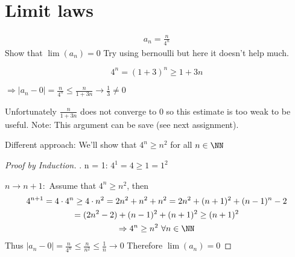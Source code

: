 \documentclass[class=scrartcl, crop=false]{standalone}
\begin{document}
\section{Limit laws}

\begin{example}
  \begin{gather*}
    a_n = \frac{n}{4^n}
  \end{gather*}
  Show that $\lim(a_n) = 0$ Try using bernoulli but here it doesn't help much.

  \[4^n = (1 + 3)^n \geq 1 + 3n\]

  $\Rightarrow |a_n - 0| = \frac{n}{4^n} \leq \frac{n}{1 + 3n} \to \frac{1}{3} \neq 0$
  \newline

  Unfortunately $\frac{n}{1 + 3n}$ does not converge to $0$ so this estimate is too weak to be useful. Note: This argument can be save (see next assignment).
  \newline

  Different approach: We'll show that $4^n \geq n^2$ for all $n \in \NN$ 

  \begin{proof}[Proof by Induction].\newline
    n = 1: $4^1 = 4 \geq 1 = 1^2$ 

    $n \to n + 1:$ Assume that $4^n \geq n^2$, then 
    \begin{gather*}
      4^{n  + 1} = 4 \cdot 4^n \geq 4 \cdot n^2 = 2n^2 + n^2 + n^2 = 2n^2 + (n + 1)^2 + (n - 1)^n - 2 \\
      = (2n^2 - 2) + (n - 1)^2 + (n + 1)^2 \geq (n + 1)^2 \\
      \Rightarrow 4^n \geq n^2 \ \forall n \in \NN
    \end{gather*}
    Thus $|a_n - 0| = \frac{n}{4^n} \leq \frac{n}{n^2} \leq \frac{1}{n} \to 0$ \newline
    Therefore $\lim(a_n) = 0$
  \end{proof}
\end{example}
\end{document}
